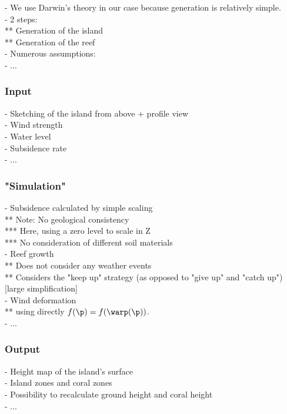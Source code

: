 - We use Darwin's theory in our case because generation is relatively simple. \\
- 2 steps: \\
** Generation of the island \\
** Generation of the reef \\
- Numerous assumptions: \\
- ...

\subsubsection{Input}
- Sketching of the island from above + profile view \\
- Wind strength \\
- Water level \\
- Subsidence rate \\
- ...

\subsubsection{"Simulation"}
- Subsidence calculated by simple scaling \\
** Note: No geological consistency \\
*** Here, using a zero level to scale in Z \\
*** No consideration of different soil materials \\
- Reef growth \\
** Does not consider any weather events \\
** Considers the "keep up" strategy (as opposed to "give up" and "catch up") [large simplification] \\
- Wind deformation \\
** using directly $f(\p) = f(\warp(\p))$. \\
- ...

\subsubsection{Output}
- Height map of the island's surface \\
- Island zones and coral zones \\
- Possibility to recalculate ground height and coral height \\
- ...

